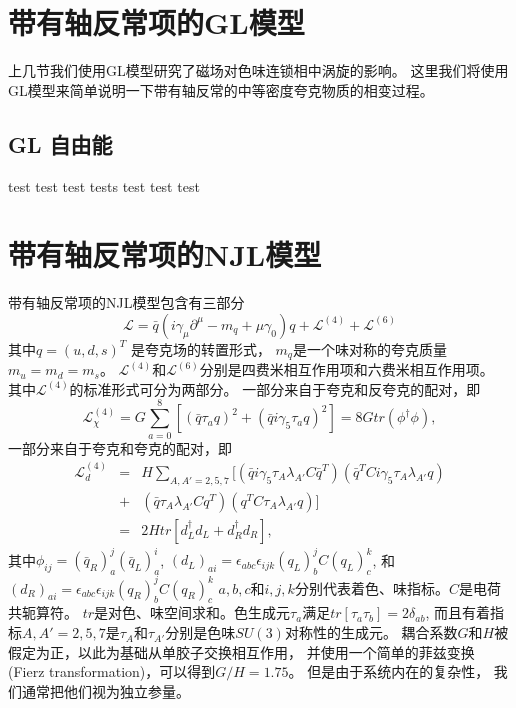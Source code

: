 

\chapter{带有轴反常项的GL模型}
上几节我们使用GL模型研究了磁场对色味连锁相中涡旋的影响。
这里我们将使用GL模型来简单说明一下带有轴反常的中等密度夸克物质的相变过程。
\section{GL 自由能}
test test test tests test test test


























\chapter{带有轴反常项的NJL模型}

带有轴反常项的NJL模型包含有三部分
\begin{equation}
    \mathcal{L} = \bar{q}(i\gamma_\mu \partial^\mu - m_q + \mu \gamma_0)q + \mathcal{L}^{(4)}+ \mathcal{L}^{(6)}
\end{equation}
其中$q = (u,d,s)^T$ 是夸克场的转置形式， $m_q$是一个味对称的夸克质量
$m_u = m_d = m_s$。
$\mathcal{L}^{(4)}$和$\mathcal{L}^{(6)}$分别是四费米相互作用项和六费米相互作用项。
其中$\mathcal{L}^{(4)}$的标准形式可分为两部分。
一部分来自于夸克和反夸克的配对，即\cite{}
\begin{equation}
   \mathcal{L}^{(4)}_\chi = G \sum_{a=0}^{8}[(\bar{q}\tau_a q)^2 + (\bar{q}i\gamma_5\tau_a q)^2]
   = 8G tr(\phi^\dagger \phi),
\end{equation}
一部分来自于夸克和夸克的配对，即\cite{}
\begin{eqnarray}
    \mathcal{L}^{(4)}_d &=& H \sum_{A,A' = 2,5,7}
    [(\bar{q} i\gamma_5\tau_A\lambda_{A'}C\bar{q}^T)(\bar{q}^TC i\gamma_5\tau_A\lambda_{A'}q)\nonumber \\
    &+&(\bar{q}\tau_A\lambda_{A'}Cq^T)(q^TC\tau_A\lambda_{A'}q)]\nonumber \\
    &=& 2Htr[d_L^\dagger d_L + d_R^\dagger d_R],
\end{eqnarray}
其中$\phi_{ij} = (\bar{q}_R)_a^j(\bar{q}_L)^i_a$,
$(d_L)_{ai}= \epsilon_{abc}\epsilon_{ijk}(q_L)^j_bC(q_L)^k_c$,
和$(d_R)_{ai}=\epsilon_{abc}\epsilon_{ijk}(q_R)^j_bC(q_R)^k_c$
$a,b,c$和$i,j,k$分别代表着色、味指标。$C$是电荷共轭算符。
$tr$是对色、味空间求和。色生成元$\tau_a$满足$tr[\tau_a \tau_b] = 2\delta_{ab}$,
而且有着指标$A, A' = 2,5,7$是$\tau_A$和$\tau_{A'}$分别是色味$SU(3)$对称性的生成元。
耦合系数$G$和$H$被假定为正，以此为基础从单胶子交换相互作用， 并使用一个简单的菲兹变换
(Fierz transformation)，可以得到$G/H = 1.75$。
但是由于系统内在的复杂性， 我们通常把他们视为独立参量。

